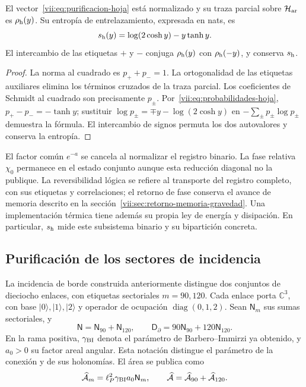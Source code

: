 \begin{proposition}
\label{vii:prop:purificacion-hoja}
El vector~\eqref{vii:eq:purificacion-hoja} está normalizado y su traza
parcial sobre \(\mathcal H_{\rm ar}\) es \(\rho_{\rm h}(y)\).
Su entropía de entrelazamiento, expresada en nats, es
\begin{equation}
 s_{\rm h}(y)=\log(2\cosh y)-y\tanh y.
 \label{vii:eq:entropia-hoja}
\end{equation}
El intercambio de las etiquetas \(+\) y \(-\) conjuga
\(\rho_{\rm h}(y)\) con \(\rho_{\rm h}(-y)\), y conserva
\(s_{\rm h}\).
\end{proposition}
\begin{proof}
La norma al cuadrado es \(p_++p_-=1\). La ortogonalidad de las
etiquetas auxiliares elimina los términos cruzados de la traza parcial.
Los coeficientes de Schmidt al cuadrado son precisamente \(p_\pm\).
Por~\eqref{vii:eq:probabilidades-hoja},
\(p_+-p_-=-\tanh y\); sustituir
\(\log p_\pm=\mp y-\log(2\cosh y)\) en
\(-\sum_\pm p_\pm\log p_\pm\) demuestra la fórmula.
El intercambio de signos permuta los dos autovalores y conserva la entropía.
\end{proof}

El factor común \(e^{-a}\) se cancela al normalizar el registro binario.
La fase relativa \(\chi_0\) permanece en el estado conjunto aunque esta
reducción diagonal no la publique. La reversibilidad lógica se refiere
al transporte del registro completo, con sus etiquetas y correlaciones;
el retorno de fase conserva el avance de memoria descrito en la
sección~\ref{vii:sec:retorno-memoria-gravedad}. Una implementación térmica
tiene además su propia ley de energía y disipación. En particular,
\(s_{\rm h}\) mide este subsistema binario y su bipartición concreta.

\subsection{Purificación de los sectores de incidencia}
\label{vii:subsec:purificacion-sectorial}

La incidencia de borde construida anteriormente distingue dos conjuntos
de dieciocho enlaces, con etiquetas sectoriales \(m=90,120\). Cada enlace
porta \(\mathbb C^3\), con base \(|0\rangle,|1\rangle,|2\rangle\)
y operador de ocupación \(\operatorname{diag}(0,1,2)\). Sean
\(\mathsf N_m\) sus sumas sectoriales, y
\begin{equation}
 \mathsf N=\mathsf N_{90}+\mathsf N_{120},\qquad
 \mathsf D_\partial=90\mathsf N_{90}+120\mathsf N_{120}.
 \label{vii:eq:ocupaciones-sectoriales}
\end{equation}
En la rama positiva, \(\gamma_{\rm BI}\) denota el parámetro de
Barbero--Immirzi ya obtenido, y \(a_0>0\) su factor areal angular.
Esta notación distingue el parámetro de la conexión y de sus holonomías.
El área se publica como
\begin{equation}
 \widehat{\mathcal A}_m=\ell_P^2\gamma_{\rm BI}a_0\mathsf N_m,
 \qquad
 \widehat{\mathcal A}=\widehat{\mathcal A}_{90}
                         +\widehat{\mathcal A}_{120}.
 \label{vii:eq:area-sectores}
\end{equation}

